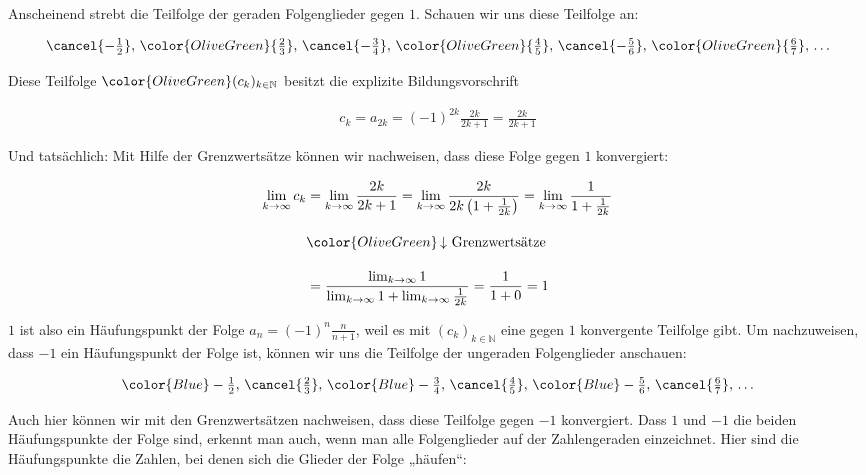 \documentclass[fontsize=9pt,
               parskip=half-,
               DIV=14,
               listof=chapterentry,
               tocflat]{scrbook}
\begin{document}
Anscheinend strebt die Teilfolge der geraden Folgenglieder gegen $1$. Schauen wir uns diese Teilfolge an:

\begin{align*}
{\cancel {-{\tfrac {1}{2}}}},\,{\color {OliveGreen}{\tfrac {2}{3}}},\,{\cancel {-{\tfrac {3}{4}}}},\,{\color {OliveGreen}{\tfrac {4}{5}}},\,{\cancel {-{\tfrac {5}{6}}}},\,{\color {OliveGreen}{\tfrac {6}{7}}},\,\ldots 
\end{align*}

Diese Teilfolge ${\color {OliveGreen}(c_{k})_{k\in \mathbb {N} }}$ besitzt die explizite Bildungsvorschrift

\begin{align*}
c_{k}=a_{2k}=(-1)^{2k}{\tfrac {2k}{2k+1}}={\tfrac {2k}{2k+1}}
\end{align*}

Und tatsächlich: Mit Hilfe der Grenzwertsätze können wir nachweisen, dass diese Folge gegen $1$ konvergiert:

\begin{align*}
\lim _{k\rightarrow \infty }c_{k}&=\lim _{k\rightarrow \infty }{\frac {2k}{2k+1}}=\lim _{k\rightarrow \infty }{\frac {2k}{2k\left(1+{\frac {1}{2k}}\right)}}=\lim _{k\rightarrow \infty }{\frac {1}{1+{\frac {1}{2k}}}}\\[1em]&{\color {OliveGreen}\left\downarrow \ {\text{Grenzwertsätze}}\right.}\\[1em]&={\frac {\lim _{k\rightarrow \infty }1}{\lim _{k\rightarrow \infty }1+\lim _{k\rightarrow \infty }{\frac {1}{2k}}}}={\frac {1}{1+0}}=1
\end{align*}

$1$ ist also ein Häufungspunkt der Folge $a_{n}=(-1)^{n}{\tfrac {n}{n+1}}$, weil es mit $(c_{k})_{k\in \mathbb {N} }$ eine gegen $1$ konvergente Teilfolge gibt. Um nachzuweisen, dass $-1$ ein Häufungspunkt der Folge ist, können wir uns die Teilfolge der ungeraden Folgenglieder anschauen:

\begin{align*}
{\color {Blue}-{\tfrac {1}{2}}},\,{\cancel {\tfrac {2}{3}}},\,{\color {Blue}-{\tfrac {3}{4}}},\,{\cancel {\tfrac {4}{5}}},\,{\color {Blue}-{\tfrac {5}{6}}},\,{\cancel {\tfrac {6}{7}}},\,\ldots 
\end{align*}

Auch hier können wir mit den Grenzwertsätzen nachweisen, dass diese Teilfolge gegen $-1$ konvergiert. Dass $1$ und $-1$ die beiden Häufungspunkte der Folge sind, erkennt man auch, wenn man alle Folgenglieder auf der Zahlengeraden einzeichnet. Hier sind die Häufungspunkte die Zahlen, bei denen sich die Glieder der Folge „häufen“:
\end{document}
